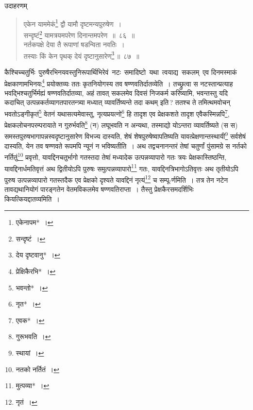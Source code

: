 \documentclass[10pt, openany]{book}
\begin{document}
{{{{उदाहरणम्\textemdash}

\begin{quote}
    
{\eg एकेन याममेकं\renewcommand{\thefootnote}{\s ३}\footnote{\s एकेनापम*~।} द्वौ यामौ दृष्टमन्यपुरुषेण~। \\
 सन्दृष्टं\renewcommand{\thefootnote}{\s ४}\footnote{\s सन्दृष्टं~।} यामत्रयमपरेण दिनान्तमपरेण~॥~८६~॥ \\
 नर्तकपक्षे देया तै रूपाणां षडन्विता नवतिः~। \\
 तस्याः किं केन पृथक् देयं दृष्टानुसारेण\renewcommand{\thefootnote}{\s ५}\footnote{\s देय दृष्टवानु*~।}\,॥~८७~॥} \end{quote}
 
{कैश्चिच्चतुर्भिः \,पुरुषैरभिनयवस्तुनिरूपार्थिभिरेवं \,नटः \,समादिष्टो \,यथा \,त्वयाद्य \,सकलम् \,एव}
{दिनमस्माकं प्रेक्षकाणामभिनयः\renewcommand{\thefootnote}{\s ६}\footnote{\s प्रेक्षिकैरभि*~।} 
प्रयोक्तव्यः ततः कृतनियोगस्य तव
षण्णवतिर्दातव्येति~।}
{तच्छ्रुत्वा स नटस्तान्प्रत्याह भवद्भिश्चतुर्भिर्मह्यं षण्णवतिर्दातव्या,
अहं तावत् सकलमेव}
{दिवसं निजकर्म करिष्यामि, भवन्तस्तु यदि कदाचित्
उत्पन्नकर्तव्यागतपारतन्त्र्या मध्यात् व्यावर्तिष्यन्ते तदा कथम् इति\,? ततश्च ते तमित्थमवोचन् भवतोऽङ्गीकृतं\renewcommand{\thefootnote}{\s ७}\footnote{\s भवन्तो*~।}  वेतनं
यथासत्यमेवास्तु, नृत्यप्रयत्नो\renewcommand{\thefootnote}{\s ८}\footnote{\s नृत*~।}  हि तादृश एव प्रेक्षकशते तादृश एवैकस्मिन्नपि\renewcommand{\thefootnote}{\s ९}\footnote{\s एवक*~।},
प्रेक्षकलोचनपरम्परायाते न गुरुर्भवति\renewcommand{\thefootnote}{\s १०}\footnote{\s गुरूभवति~।} (न) लघूभवति न अन्यथा, तस्माद्यो योऽन्तरा व्यावर्तिष्यते (स स)
समस्तपुरुषभागापन्नस्वदृष्टानुसारेण विभज्य दास्यति, शेषं शेषपुरुषेष्वापतिष्यति
यावत्प्रेक्षणान्तस्थायी\renewcommand{\thefootnote}{\s ११}\footnote{\s *स्थायां~।}  सर्वशेषं}
{दास्यति, येन तव षण्णवते रूपमपि न्यूनं न भविष्यतीति~। अथ तद्वचनानन्तरं
तेषां चतुर्णां}
{पुंसामग्रे स नर्तको नर्तितुं\renewcommand{\thefootnote}{\s १२}\footnote{\s नतको नर्तितं~।}  प्रवृत्तो, यावद्दिनचतुर्भागो गतस्तदा
तेषां मध्यादेक उत्पन्नव्यापारो गतः}
{त्रयः प्रेक्षकास्तिष्ठन्ति, यावद्दिनार्धमतिवृत्तं अथ द्वितीयोऽपि
पुरुषः समुत्पन्नव्यापारो\renewcommand{\thefootnote}{\s १३}\footnote{\s *मुत्पव्या*~।}  गतः, यावद्दिनत्रिभागोऽतिवृत्तः अथ तृतीयोऽपि पुरुष उत्पन्नव्यापारो गतस्तदैक एव
प्रेक्षको दृश्यते यावद्दिनं}
{नृत्यं\renewcommand{\thefootnote}{\s १४}\footnote{\s नृतं~।}  च सम्पू-र्णमिति~। तत्र तेन नटेन तावद्यथानियोगं पारङ्गतेन
वेतमविकलमेव}
{षण्णवतिराप्ता~। तैस्तु प्रेक्षकैरसमदर्शिभिः कियत्कियद्दातव्यमिति~।}

\newpage

}}}
\end{document}
